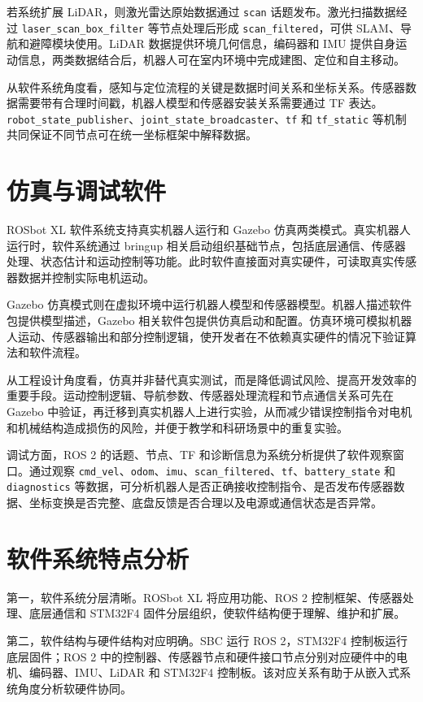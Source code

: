 \documentclass[UTF8,a4paper,12pt]{ctexrep}
\begin{document}
若系统扩展 LiDAR，则激光雷达原始数据通过 \texttt{scan} 话题发布。激光扫描数据经过 \texttt{laser\_scan\_box\_filter} 等节点处理后形成 \texttt{scan\_filtered}，可供 SLAM、导航和避障模块使用。LiDAR 数据提供环境几何信息，编码器和 IMU 提供自身运动信息，两类数据结合后，机器人可在室内环境中完成建图、定位和自主移动。

从软件系统角度看，感知与定位流程的关键是数据时间关系和坐标关系。传感器数据需要带有合理时间戳，机器人模型和传感器安装关系需要通过 TF 表达。\texttt{robot\_state\_publisher}、\texttt{joint\_state\_broadcaster}、\texttt{tf} 和 \texttt{tf\_static} 等机制共同保证不同节点可在统一坐标框架中解释数据。

\section{仿真与调试软件}

ROSbot XL 软件系统支持真实机器人运行和 Gazebo 仿真两类模式。真实机器人运行时，软件系统通过 bringup 相关启动组织基础节点，包括底层通信、传感器处理、状态估计和运动控制等功能。此时软件直接面对真实硬件，可读取真实传感器数据并控制实际电机运动。

Gazebo 仿真模式则在虚拟环境中运行机器人模型和传感器模型。机器人描述软件包提供模型描述，Gazebo 相关软件包提供仿真启动和配置。仿真环境可模拟机器人运动、传感器输出和部分控制逻辑，使开发者在不依赖真实硬件的情况下验证算法和软件流程。

从工程设计角度看，仿真并非替代真实测试，而是降低调试风险、提高开发效率的重要手段。运动控制逻辑、导航参数、传感器处理流程和节点通信关系可先在 Gazebo 中验证，再迁移到真实机器人上进行实验，从而减少错误控制指令对电机和机械结构造成损伤的风险，并便于教学和科研场景中的重复实验。

调试方面，ROS 2 的话题、节点、TF 和诊断信息为系统分析提供了软件观察窗口。通过观察 \texttt{cmd\_vel}、\texttt{odom}、\texttt{imu}、\texttt{scan\_filtered}、\texttt{tf}、\texttt{battery\_state} 和 \texttt{diagnostics} 等数据，可分析机器人是否正确接收控制指令、是否发布传感器数据、坐标变换是否完整、底盘反馈是否合理以及电源或通信状态是否异常。

\section{软件系统特点分析}

第一，软件系统分层清晰。ROSbot XL 将应用功能、ROS 2 控制框架、传感器处理、底层通信和 STM32F4 固件分层组织，使软件结构便于理解、维护和扩展。

第二，软件结构与硬件结构对应明确。SBC 运行 ROS 2，STM32F4 控制板运行底层固件；ROS 2 中的控制器、传感器节点和硬件接口节点分别对应硬件中的电机、编码器、IMU、LiDAR 和 STM32F4 控制板。该对应关系有助于从嵌入式系统角度分析软硬件协同。
\end{document}
